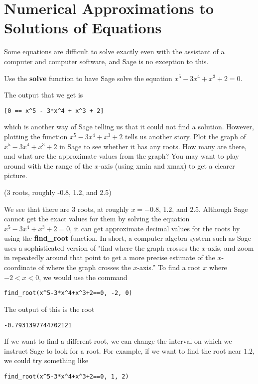 \documentclass[12pt]{amsart}
\theoremstyle{definition}
\theoremstyle{definition}
\begin{document}
\section{Numerical Approximations to Solutions of Equations}

Some equations are difficult to solve exactly even with the
assistant of a computer and computer software, and Sage is no
exception to this. 

Use the \textbf{solve} function to have Sage solve the
equation $x^5-3x^4+x^3+2=0$. 

The output that we get is
\begin{verbatim}
[0 == x^5 - 3*x^4 + x^3 + 2]
\end{verbatim}

which is another way of Sage telling us that it could not find a solution.
However, plotting the function $x^5-3x^4+x^3+2$ tells us another story.
Plot the graph of $x^5-3x^4+x^3+2$ in Sage to see whether it has
any roots. How many are there, and what are the approximate values
from the graph? You may want to play around with the range of the
$x$-axis (using xmin and xmax) to get a clearer picture.

(3 roots, roughly -0.8, 1.2, and 2.5)

We see that there are 3 roots, at roughly $x=-0.8$, $1.2$, and $2.5$.
Although Sage cannot get the exact values for them by solving
the equation $x^5-3x^4+x^3+2=0$, it can get approximate decimal
values for the roots by using the \textbf{find\_root} function. In
short, a computer algebra system such as Sage uses a sophisticated
version of "find where the graph crosses the $x$-axis, and zoom in
repeatedly around that point to get a more precise estimate of the
$x$-coordinate of where the graph crosses the $x$-axis.'' To find
a root $x$ where $-2<x<0$, we would use the command

\begin{verbatim}
find_root(x^5-3*x^4+x^3+2==0, -2, 0)
\end{verbatim}

The output of this is the root

\begin{verbatim}
-0.7931397744702121
\end{verbatim}

If we want to find a different root, we can change the interval on
which we instruct Sage to look for a root. For example, if we want
to find the root near $1.2$, we could try something like

\begin{verbatim}
find_root(x^5-3*x^4+x^3+2==0, 1, 2)
\end{verbatim}
\end{document}
